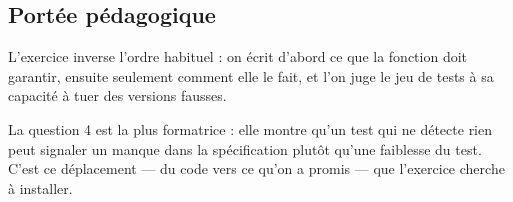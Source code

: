 \subsection*{Portée pédagogique}

L'exercice inverse l'ordre habituel : on écrit d'abord ce que la fonction doit
garantir, ensuite seulement comment elle le fait, et l'on juge le jeu de tests à
sa capacité à tuer des versions fausses.

La question 4 est la plus formatrice : elle montre qu'un test qui ne détecte
rien peut signaler un manque dans la spécification plutôt qu'une faiblesse du
test. C'est ce déplacement — du code vers ce qu'on a promis — que l'exercice
cherche à installer.
